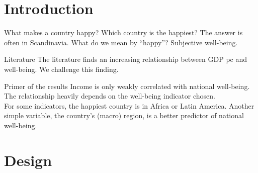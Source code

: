 \documentclass[aspectratio=169,xcolor=dvipsnames, 11pt,mathserif]{beamer}
\begin{document}

\section{Introduction}

\begin{frame}{What makes a country happy?}
    \bbvsp
    \ip Which country is the happiest?
    \ip The answer is often in Scandinavia. %
    \ip What do we mean by ``happy''? \pause Subjective well-being.
    \ee
\end{frame}

\begin{frame}{Literature}
    \bbvsp
    \ip The literature finds an increasing relationship between GDP pc and well-being.%
    \ip We challenge this finding.
    \ee
\end{frame}

\begin{frame}{Primer of the results}
    \bbvsp
    \ip Income is only weakly correlated with national well-being.
    \ip The relationship heavily depends on the well-being indicator chosen. \pause \\ For some indicators, the happiest country is in Africa or Latin America.\pause
    \ip Another simple variable, the country's (macro) region, is a better predictor of national well-being.
    \ee
\end{frame}

\section{Design}
\end{document}
